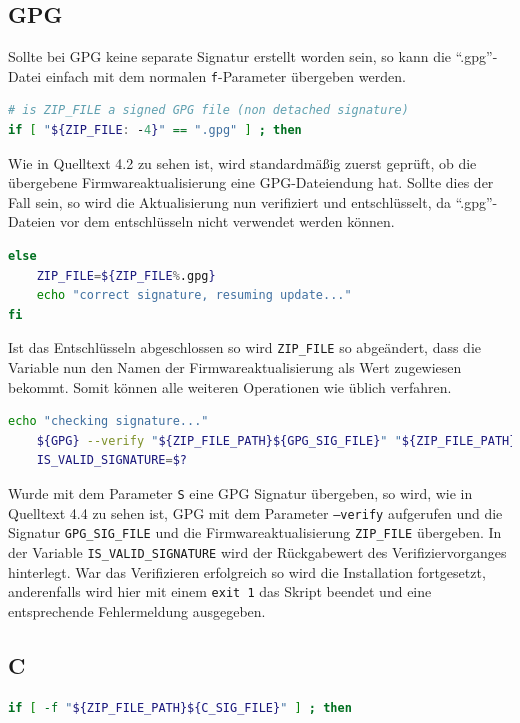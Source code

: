 \documentclass[thesis=bachelor,faculty=cb]{hsmw-thesis}
\begin{document}
{\subsection*{GPG}
Sollte bei GPG keine separate Signatur erstellt worden sein, so kann die \enquote{.gpg}-Datei einfach mit dem normalen \texttt{f}-Parameter übergeben werden.
\begin{lstlisting}[language=bash, caption={.gpg file handling icsupdate.sh}]
# is ZIP_FILE a signed GPG file (non detached signature)
if [ "${ZIP_FILE: -4}" == ".gpg" ] ; then
\end{lstlisting}
Wie in Quelltext 4.2 zu sehen ist, wird standardmäßig zuerst geprüft, ob die übergebene Firmwareaktualisierung eine GPG-Dateiendung hat. Sollte dies der Fall sein, so wird die Aktualisierung nun verifiziert und entschlüsselt, da \enquote{.gpg}-Dateien vor dem entschlüsseln nicht verwendet werden können.
\newpage
\begin{lstlisting}[language=bash, caption={.gpg Umbenennung icsupdate.sh}]
else
    ZIP_FILE=${ZIP_FILE%.gpg}
    echo "correct signature, resuming update..."
fi
\end{lstlisting}
Ist das Entschlüsseln abgeschlossen so wird \texttt{ZIP\_FILE} so abgeändert, dass die Variable nun den Namen der Firmwareaktualisierung  als Wert zugewiesen bekommt. Somit können alle weiteren Operationen wie üblich verfahren.
\\[1cm]
\begin{lstlisting}[language=bash, caption={GPG Verifizierung icsupdate.sh}]
echo "checking signature..."
	${GPG} --verify "${ZIP_FILE_PATH}${GPG_SIG_FILE}" "${ZIP_FILE_PATH}${ZIP_FILE}" 2>/dev/null
	IS_VALID_SIGNATURE=$?
\end{lstlisting}
Wurde mit dem Parameter \texttt{S} eine GPG Signatur übergeben, so wird, wie in Quelltext 4.4 zu sehen ist, GPG mit dem Parameter \texttt{--verify} aufgerufen und die Signatur \texttt{GPG\_SIG\_FILE} und die Firmwareaktualisierung \texttt{ZIP\_FILE} übergeben. In der Variable \texttt{IS\_VALID\_SIGNATURE} wird der Rückgabewert des Verifiziervorganges hinterlegt. War das Verifizieren erfolgreich so wird die Installation fortgesetzt, anderenfalls wird hier mit einem \texttt{exit 1} das Skript beendet und eine entsprechende Fehlermeldung ausgegeben.
\newpage
\subsection*{C}
\begin{lstlisting}[language=bash, caption={C Verifizierung icsupdate.sh}]
if [ -f "${ZIP_FILE_PATH}${C_SIG_FILE}" ] ; then


\end{lstlisting}}
\end{document}
